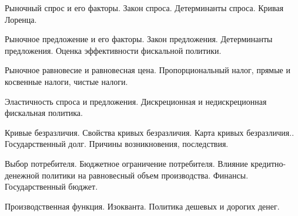 \newpage


\shapkFull
\setcounter{zad}{0}

\z 	Рыночный спрос и его факторы.  Закон спроса. Детерминанты спроса.
 \medskip
\z 	Кривая Лоренца.
 \medskip

\newpage


\shapkFull
\setcounter{zad}{0}

\z 	Рыночное предложение и его факторы.  Закон предложения. Детерминанты предложения.
 \medskip
\z 	Оценка эффективности фискальной политики.
 \medskip

\newpage


\shapkFull
\setcounter{zad}{0}

\z 	Рыночное равновесие и равновесная цена.
 \medskip
\z 	Пропорциональный налог, прямые и косвенные налоги, чистые налоги.
 \medskip

\newpage


\shapkFull
\setcounter{zad}{0}

\z 	Эластичность спроса и предложения.
 \medskip
\z 	Дискреционная и недискреционная фискальная политика.
 \medskip

\newpage


\shapkFull
\setcounter{zad}{0}

\z 	Кривые безразличия. Свойства кривых безразличия. Карта кривых безразличия..
 \medskip
\z 	Государственный долг. Причины возникновения, последствия.
 \medskip

\newpage


\shapkFull
\setcounter{zad}{0}

\z 	Выбор потребителя. Бюджетное ограничение потребителя.
 \medskip
\z 	Влияние кредитно-денежной политики на равновесный объем производства.	Финансы. Государственный бюджет.
 \medskip

\newpage


\shapkFull
\setcounter{zad}{0}

\z 	Производственная функция. Изокванта.
 \medskip
\z 	Политика дешевых и дорогих денег.
 \medskip

\newpage


\shapkFull
\setcounter{zad}{0}

